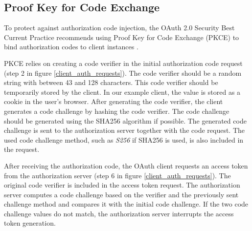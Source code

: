 \subsection{Proof Key for Code Exchange}
\label{sec:pkce}
To protect against authorization code injection, the OAuth 2.0 Security Best Current Practice \citep{ietf-oauth-security-topics-27} recommends using Proof Key for Code Exchange (PKCE) to bind authorization codes to client instances \citep{rfc7636}.

PKCE relies on creating a code verifier in the initial authorization code request (step 2 in figure \ref{client_auth_requests}).
The code verifier should be a random string with between 43 and 128 characters.
This code verifier should be temporarily stored by the client.
In our example client, the value is stored as a cookie in the user's browser.
After generating the code verifier, the client generates a code challenge by hashing the code verifier.
The code challenge should be generated using the SHA256 algorithm \citep{dang_secure_2015} if possible.
The generated code challenge is sent to the authorization server together with the code request.
The used code challenge method, such as \textit{S256} if SHA256 is used, is also included in the request.

After receiving the authorization code, the OAuth client requests an access token from the authorization server (step 6 in figure \ref{client_auth_requests}).
The original code verifier is included in the access token request.
The authorization server computes a code challenge based on the verifier and the previously sent challenge method and compares it with the initial code challenge.
If the two code challenge values do not match, the authorization server interrupts the access token generation.



